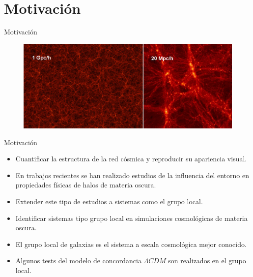 \documentclass[8pt,fleqn]{beamer}
\begin{document}
\section{Motivación}
\label{sec:motivo}
\begin{frame}
\begin{block}{Motivación}\justifying
\begin{figure}[htbp]
	\centering
	\includegraphics[trim = 0mm 0mm 0mm 0mm, clip, width=1.0\textwidth]
	{./figures/Web.png}
\end{figure}
\end{block}
\end{frame}
\begin{frame}
\begin{block}{Motivación}\justifying

\begin{itemize}
\item Cuantificar la estructura de la red cósmica y reproducir su apariencia 
visual.
\item En trabajos recientes se han realizado estudios de la influencia del 
entorno en propiedades físicas de halos de materia oscura.
\item Extender este tipo de estudios a sistemas como el grupo local.
\item Identificar sistemas tipo grupo local en simulaciones cosmológicas de 
materia oscura.
\item El grupo local de galaxias es el sistema a escala cosmológica mejor 
conocido.
\item Algunos tests del modelo de concordancia $\Lambda CDM$ son realizados 
en el grupo local.
\end{itemize}

\end{block}
\end{frame}
\end{document}
